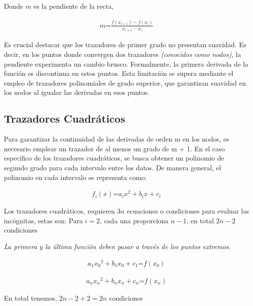 \documentclass[conference]{IEEEtran}
\begin{document}
Donde $m$ es la pendiente de la recta,

\begin{align*}
	m \text{=} \frac{f(x_{i + 1}) - f(x_{i})}{x_{i + 1} - x_{i}}
\end{align*}

Es crucial destacar que los trazadores de primer grado no presentan
suavidad. Es decir, en los puntos donde convergen dos trazadores
\textit{(conocidos como nodos)}, la pendiente experimenta un cambio brusco.
Formalmente, la primera derivada de la función es discontinua en estos
puntos. Esta limitación se supera mediante el empleo de trazadores
polinomiales de grado superior, que garantizan suavidad en los nodos al
igualar las derivadas en esos puntos.

\subsection{Trazadores Cuadráticos}

Para garantizar la continuidad de las derivadas de orden m en los nodos,
es necesario emplear un trazador de al menos un grado de m + 1. En el
caso específico de los trazadores cuadráticos, se busca obtener un
polinomio de segundo grado para cada intervalo entre los datos. De manera
general, el polinomio en cada intervalo se representa como:

\begin{align}
	f_{i}(x) \text{=}  a_{i}{x}^{2} + b_{i}x + c_{i}
	\label{eq:cuadratic_equation}
\end{align}

Los trazadores cuadráticos, requieren $3n$ ecuaciones o condiciones
para evaluar las incógnitas, estas son:
 Para $i = 2$, cada una proporciona $n - 1$, en total $2n - 2$ condiciones

	\item \textit{La primera y la última función deben pasar a través de los puntos extremos.}

	      \begin{align}
		      a_{1}{x_{0}}^{2} + b_{1}x_{0} + c_{1} \text{=} f(x_{0})
		      \label{eq:18.31}
	      \end{align}

	      \begin{align}
		      a_{n}{x_{n}}^{2} + b_{n}x_{n} + c_{n} \text{=} f(x_{n})
		      \label{eq:18.32}
	      \end{align}

	      En total tenemos, $2n - 2 + 2 = 2n$ condiciones \\
\end{document}
